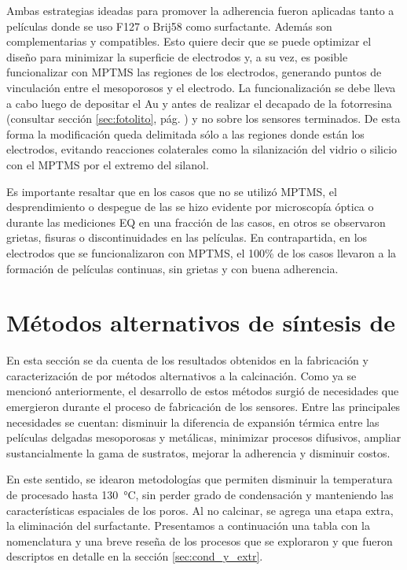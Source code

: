 			 Ambas estrategias ideadas para promover la adherencia fueron aplicadas tanto a películas donde se uso F127 o Brij58 como surfactante. Además son complementarias y compatibles. Esto quiere decir que se puede optimizar el diseño para minimizar la superficie de electrodos y, a su vez, es posible funcionalizar con MPTMS las regiones de los electrodos, generando puntos de vinculación entre el mesoporosos y el electrodo. La funcionalización se debe lleva a cabo luego de depositar el Au y antes de realizar el decapado de la fotorresina (consultar sección \ref{sec:fotolito}, pág. \pageref{sec:fotolito}) y no sobre los sensores terminados. De esta forma la modificación queda delimitada sólo a las regiones donde están los electrodos, evitando reacciones colaterales como la silanización del vidrio o silicio con el MPTMS por el extremo del silanol.

			 Es importante resaltar que en los casos que no se utilizó MPTMS, el desprendimiento o despegue de las \pdm\space se hizo evidente por microscopía óptica o durante las mediciones EQ en una fracción de las casos, en otros se observaron grietas, fisuras o discontinuidades en las películas. En contrapartida, en los electrodos que se funcionalizaron con MPTMS, el 100\% de los casos llevaron a la formación de películas continuas, sin grietas y con buena adherencia.

\section{Métodos alternativos de síntesis de \pdm}
	
	 En esta sección se da cuenta de los resultados obtenidos en la fabricación y caracterización de \pdm\space por métodos alternativos a la calcinación. Como ya se mencionó anteriormente, el desarrollo de estos métodos surgió de necesidades que emergieron durante el proceso de fabricación de los sensores. Entre las principales necesidades se cuentan: disminuir la diferencia de expansión térmica entre las películas delgadas mesoporosas y metálicas, minimizar procesos difusivos, ampliar sustancialmente la gama de sustratos, mejorar la adherencia y disminuir costos.

	 En este sentido, se idearon metodologías que permiten disminuir la temperatura de procesado hasta \SI{130}{\celsius}, sin perder grado de condensación y manteniendo las características espaciales de los poros. Al no calcinar, se agrega una etapa extra, la eliminación del surfactante. Presentamos a continuación una tabla con la nomenclatura y una breve reseña de los procesos que se exploraron y que fueron descriptos en detalle en la sección \ref{sec:cond_y_extr}.

